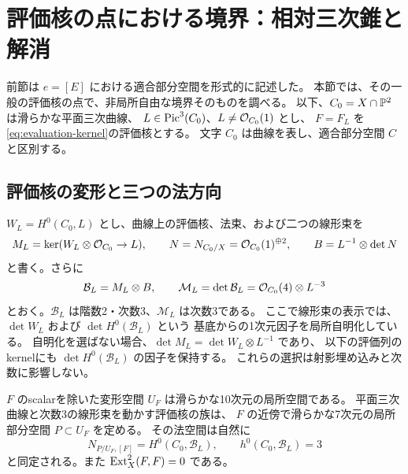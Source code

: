 \section{評価核の点における境界：相対三次錐と解消}
\label{sec:local-bn-cubic}

前節は $e=[E]$ における適合部分空間を形式的に記述した。
本節では、その一般の評価核の点で、非局所自由な境界そのものを調べる。
以下、$C_0=X\cap\mathbb P^2$ は滑らかな平面三次曲線、
$L\in\operatorname{Pic}^3(C_0)$、$L\ne\mathcal O_{C_0}(1)$ とし、
$F=F_L$ を\eqref{eq:evaluation-kernel}の評価核とする。
文字 $C_0$ は曲線を表し、適合部分空間 $C$ と区別する。

\subsection{評価核の変形と三つの法方向}

$W_L=H^0(C_0,L)$ とし、曲線上の評価核、法束、および二つの線形束を
\[
 M_L=\ker(W_L\otimes\mathcal O_{C_0}\to L),\qquad
 N=N_{C_0/X}=\mathcal O_{C_0}(1)^{\oplus2},\qquad
 B=L^{-1}\otimes\det N
\]
と書く。さらに
\begin{equation}\label{eq:local-bn-bundle}
 \mathcal B_L=M_L\otimes B,\qquad
 \mathcal M_L=\det\mathcal B_L=\mathcal O_{C_0}(4)\otimes L^{-3}
\end{equation}
とおく。$\mathcal B_L$ は階数2・次数3、$\mathcal M_L$ は次数3である。
ここで線形束の表示では、$\det W_L$ および $\det H^0(\mathcal B_L)$ という
基底からの1次元因子を局所自明化している。
自明化を選ばない場合、$\det M_L=\det W_L\otimes L^{-1}$ であり、
以下の評価列のkernelにも $\det H^0(\mathcal B_L)$ の因子を保持する。
これらの選択は射影埋め込みと次数に影響しない。

\begin{theorem}[評価核の滑らかな変形空間]\label{thm:evaluation-local-moduli}
$F$ のscalarを除いた変形空間 $U_F$ は滑らかな10次元の局所空間である。
平面三次曲線と次数3の線形束を動かす評価核の族は、
$F$ の近傍で滑らかな7次元の局所部分空間 $P\subset U_F$ を定める。
その法空間は自然に
\[
 N_{P/U_F,[F]}=H^0(C_0,\mathcal B_L),\qquad h^0(C_0,\mathcal B_L)=3
\]
と同定される。また $\operatorname{Ext}^2_X(F,F)=0$ である。
\end{theorem}

